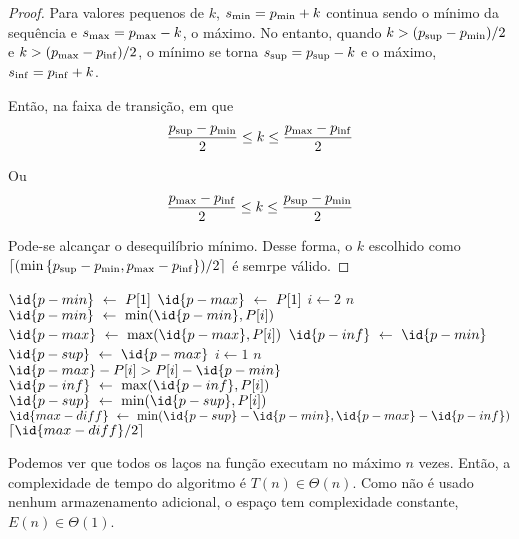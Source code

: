 \begin{proof}
    Para valores pequenos de $k$, $s_{\mathrm{min}} = p_{\min} + k$ continua sendo o mínimo da sequência e $s_{\mathrm{max}} = p_{\max} - k$, o máximo. No entanto, quando $k > (p_{\mathrm{sup}} - p_{\min}) / 2$ e $k > (p_{\max} - p_{\mathrm{inf}}) / 2$, o mínimo se torna $s_{\mathrm{sup}} = p_{\mathrm{sup}} - k$ e o máximo, $s_{\mathrm{inf}} = p_{\mathrm{inf}} + k$.

    Então, na faixa de transição, em que
    \[
        \frac{p_{\mathrm{sup}} - p_{\min}}{2} \leq k \leq \frac{p_{\max} - p_{\mathrm{inf}}}{2}
    \]

    Ou
    \[
        \frac{p_{\max} - p_{\mathrm{inf}}}{2} \leq k \leq \frac{p_{\mathrm{sup}} - p_{\min}}{2}
    \]

    Pode-se alcançar o desequilíbrio mínimo. Desse forma, o $k$ escolhido como \\$\left\lceil (\min\left\{p_{\mathrm{sup}} - p_{\min}, p_{\max} - p_{\mathrm{inf}}\right\})/2\right\rceil$ é semrpe válido.
\end{proof}

\itemdsep

\begin{codebox}
    \li $\id{p-min} \gets P[1]$
    \li $\id{p-max} \gets P[1]$
    \li {} $i \gets 2$  $n$
        \Do
    \li     $\id{p-min} \gets \min(\id{p-min}, P[i])$
    \li     $\id{p-max} \gets \max(\id{p-max}, P[i])$
        \End
    \li
    \li $\id{p-inf} \gets \id{p-min}$
    \li $\id{p-sup} \gets \id{p-max}$
    \li {} $i \gets 1$  $n$
        \Do
    \li     {} $\id{p-max} - P[i] > P[i] - \id{p-min}$ 
            \Do
    \li         $\id{p-inf} \gets \max(\id{p-inf}, P[i])$
            \End
    \li     {}
            \Do
    \li         $\id{p-sup} \gets \min(\id{p-sup}, P[i])$
            \End
        \End
    \li
    \li $\id{max-diff} \gets \min(\id{p-sup} - \id{p-min}, \id{p-max} - \id{p-inf})$
    \li {} $\lceil \id{max-diff} / 2 \rceil$
\end{codebox}

\itemdsep

Podemos ver que todos os laços na função executam no máximo $n$ vezes. Então, a complexidade de tempo do algoritmo é $T(n) \in \Theta(n)$. Como não é usado nenhum armazenamento adicional, o espaço tem complexidade constante, $E(n) \in \Theta(1)$.

